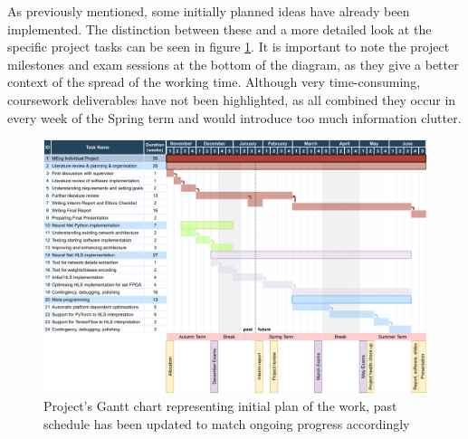 As previously mentioned, some initially planned ideas have already been implemented. The distinction between these and a more detailed look at the specific project tasks can be seen in figure \ref{fig:gantt-chart}. It is important to note the project milestones and exam sessions at the bottom of the diagram, as they give a better context of the spread of the working time. Although very time-consuming, coursework deliverables have not been highlighted, as all combined they occur in every week of the Spring term and would introduce too much information clutter.

\begin{figure}[hpt]
  \centering
  \includegraphics[trim={0cm 0cm 0cm 0cm}, width=1.2\textwidth, center]{project/gantt_chart.pdf}
  \caption{Project's Gantt chart representing initial plan of the work, past schedule has been updated to match ongoing progress accordingly}
  \label{fig:gantt-chart}
\end{figure}